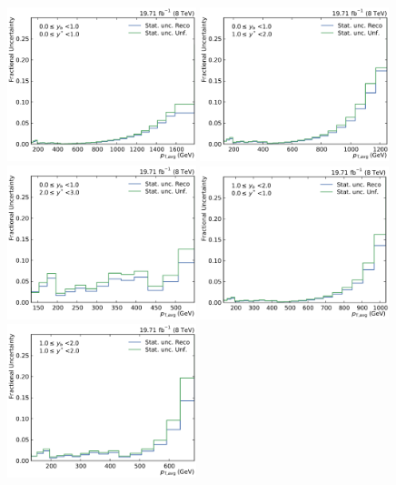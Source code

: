 \begin{figure}[htbp]
    \centering
    \includegraphics[width=0.49\textwidth]{figures/measurement/statunc_fractional_yb0ys0.pdf}\hfill
    \includegraphics[width=0.49\textwidth]{figures/measurement/statunc_fractional_yb0ys1.pdf}
    \includegraphics[width=0.49\textwidth]{figures/measurement/statunc_fractional_yb0ys2.pdf}\hfill
    \includegraphics[width=0.49\textwidth]{figures/measurement/statunc_fractional_yb1ys0.pdf}
    \includegraphics[width=0.49\textwidth]{figures/measurement/statunc_fractional_yb1ys1.pdf}\hfill

\end{figure}
